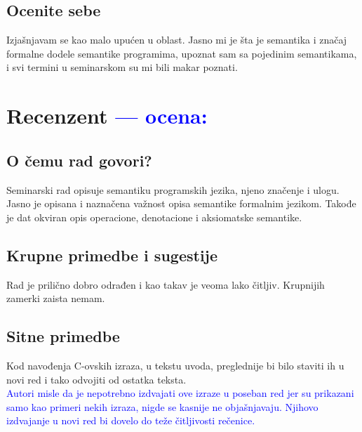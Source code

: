\documentclass[a4paper]{report}
\newcommand{\odgovor}[1]{\textcolor{blue}{#1}}
\begin{document}
\section{Ocenite sebe}

Izjašnjavam se kao malo upućen u oblast. Jasno mi je šta je semantika i značaj formalne dodele semantike programima, upoznat sam sa pojedinim semantikama, i
svi termini u seminarskom su mi bili makar poznati.  


\chapter{Recenzent \odgovor{--- ocena:} }


\section{O čemu rad govori?}
Seminarski rad opisuje semantiku programskih jezika, njeno značenje i ulogu. Jasno je opisana i naznačena važnost opisa semantike formalnim jezikom. Takođe je dat okviran opis operacione, denotacione i aksiomatske semantike. 

\section{Krupne primedbe i sugestije}

Rad je prilično dobro odrađen i kao takav je veoma lako čitljiv. Krupnijih zamerki zaista nemam.

\section{Sitne primedbe}
Kod navođenja C-ovskih izraza, u tekstu uvoda, preglednije bi bilo staviti ih u novi red i tako odvojiti od ostatka teksta. \\
\odgovor{Autori misle da je nepotrebno izdvajati ove izraze u poseban red jer su prikazani samo kao primeri nekih izraza, nigde se kasnije ne objašnjavaju. Njihovo izdvajanje u novi red bi dovelo do teže čitljivosti rečenice.}\\
\end{document}
